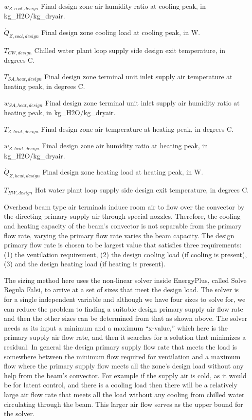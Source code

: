 \({w_{Z,cool,design } }\) Final design zone air humidity ratio at cooling peak, in kg\_H2O/kg\_dryair.

\({\dot Q_{Z,cool,design } }\) Final design zone cooling load at cooling peak, in W.

\({T_{CW,design}}\) Chilled water plant loop supply side design exit temperature, in degrees C.

\({T_{SA,heat,design } }\) Final design zone terminal unit inlet supply air temperature at heating peak, in degrees C.

\({w_{SA,heat,design } }\) Final design zone terminal unit inlet supply air humidity ratio at heating peak, in kg\_H2O/kg\_dryair.

\({T_{Z,heat,design } }\) Final design zone air temperature at heating peak, in degrees C.

\({w_{Z,heat,design } }\) Final design zone air humidity ratio at heating peak, in kg\_H2O/kg\_dryair.

\({\dot Q_{Z,heat,design } }\) Final design zone heating load at heating peak, in W.

\({T_{HW,design}}\) Hot water plant loop supply side design exit temperature, in degrees C.

Overhead beam type air terminals induce room air to flow over the convector by the directing primary supply air through special nozzles. Therefore, the cooling and heating capacity of the beam's convector is not separable from the primary flow rate, varying the primary flow rate varies the beam capacity. The design primary flow rate is chosen to be largest value that satisfies three requirements: (1) the ventilation requirement, (2) the design cooling load (if cooling is present), (3) and the design heating load (if heating is present).

The sizing method here uses the non-linear solver inside EnergyPlus, called Solve Regula Falsi, to arrive at a set of sizes that meet the design load. The solver is for a single independent variable and although we have four sizes to solve for, we can reduce the problem to finding a suitable design primary supply air flow rate and then the other sizes can be determined from that as shown above. The solver needs as its input a minimum and a maximum ``x-value,'' which here is the primary supply air flow rate, and then it searches for a solution that minimizes a residual. In general the design primary supply flow rate that meets the load is somewhere between the minimum flow required for ventilation and a maximum flow where the primary supply flow meets all the zone's design load without any help from the beam's convector. For example if the supply air is cold, as it would be for latent control, and there is a cooling load then there will be a relatively large air flow rate that meets all the load without any cooling from chilled water circulating through the beam. This larger air flow serves as the upper bound for the solver.

